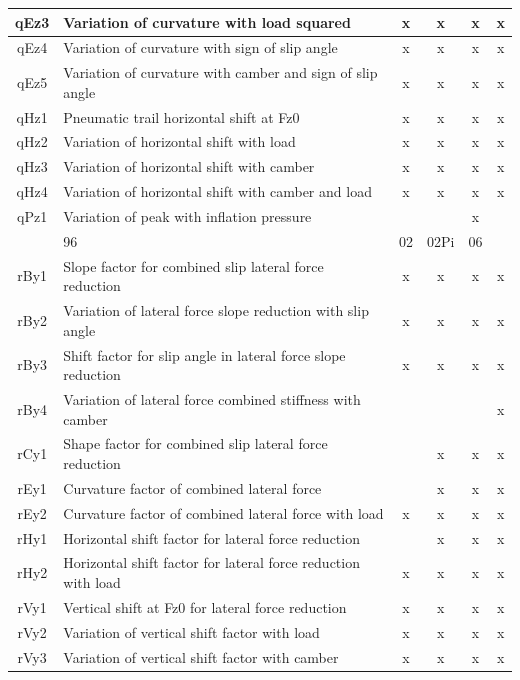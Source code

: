 \begin{center}
\begin{longtable}[c]{|c|p{4in}|cccc|}
			qEz3	&Variation of curvature with load squared	&x	&x &x	&x\\ \hline
			qEz4	&Variation of curvature with sign of slip angle    	&x &x	&x	&x\\ \hline
			qEz5	&Variation of curvature with camber and sign of slip angle  	&x &x	&x	&x\\ \hline
			qHz1	&Pneumatic trail horizontal shift at Fz0	&x	&x &x	&x\\ \hline
			qHz2	&Variation of horizontal shift with load	&x	&x &x	&x\\ \hline
			qHz3	&Variation of horizontal shift with camber	&x	&x &x	&x\\ \hline
			qHz4	&Variation of horizontal shift with camber and load	&x &x	&x	&x\\ \hline
			qPz1	&Variation of peak with inflation pressure			&&&x&	\\ \hline
			\rowcolor{ttblue}\multicolumn{2}{|c|}{\cellcolor{ttblue}\textbf{Combined Lateral}}&96&	02&	02Pi&	06 \\ \hline
			rBy1	&Slope factor for combined slip lateral force reduction	&x	&x &x		&x\\ \hline
			rBy2	&Variation of lateral force slope reduction with slip angle	&x	&x 	&x	&x\\ \hline
			rBy3	&Shift factor for slip angle in lateral force slope reduction	&x  &x  &x  &x\\ \hline
			rBy4	&Variation of lateral force combined stiffness with camber	&	&	&	&x\\ \hline
			rCy1	&Shape factor for combined slip lateral force reduction		&&x	&x	 &x\\ \hline
			rEy1	&Curvature factor of combined lateral force		&&x	&x 	&x\\ \hline
			rEy2	&Curvature factor of combined lateral force with load	&x	&x 	&x	&x\\ \hline
			rHy1	&Horizontal shift factor for lateral force reduction		&&x	 &x	&x\\ \hline
	 		rHy2	&Horizontal shift factor for lateral force reduction with load	&x	 &x	&x	&x\\ \hline
			rVy1	&Vertical shift at Fz0 for lateral force reduction 	&x	&x &x	&x\\ \hline
			rVy2	&Variation of vertical shift factor with load	&x	&x	&x &x\\ \hline
			rVy3	&Variation of vertical shift factor with camber	&x	&x	&x 	&x\\ \hline

\end{longtable}
\end{center}
